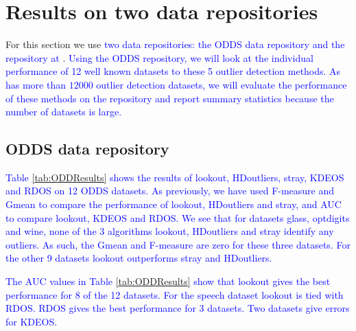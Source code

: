 \documentclass[12pt]{article}
\theoremstyle{definition}
\theoremstyle{definition}
\theoremstyle{definition}
\theoremstyle{remark}
\begin{document}
\hypertarget{sec:applications}{%
\section{Results on two data repositories}\label{sec:applications}}

For this section we use \textcolor{blue}{two data repositories: the ODDS data repository} \citep{datasetsODDS} \textcolor{blue}{and the repository at} \citet{datasets}. \textcolor{blue}{Using the ODDS repository, we will look at the individual performance of 12 well known datasets to these 5 outlier detection methods. As} \citet{datasets} \textcolor{blue}{ has more than $12000$ outlier detection datasets, we will evaluate the performance of these methods on the repository and report summary statistics because the number of datasets is large. }

\hypertarget{odds-data-repository}{%
\subsection{ODDS data repository}\label{odds-data-repository}}

\textcolor{blue}{Table \ref{tab:ODDResults} shows the results of lookout, HDoutliers, stray, KDEOS and RDOS on  12 ODDS datasets. As previously, we have used F-measure and Gmean to compare the performance of lookout,  HDoutliers and stray, and AUC to compare lookout, KDEOS and RDOS. We see that for datasets glass, optdigits and wine, none of the 3 algorithms lookout, HDoutliers and stray identify any outliers. As such, the Gmean and F-measure are zero for these three datasets.  For the other 9 datasets lookout outperforms stray and HDoutliers.  }

\textcolor{blue}{The AUC values in Table \ref{tab:ODDResults} show that lookout gives the best performance for 8 of the 12 datasets. For the speech dataset lookout is tied with RDOS. RDOS gives the best performance for 3 datasets. Two datasets give errors for KDEOS.
}
\end{document}
